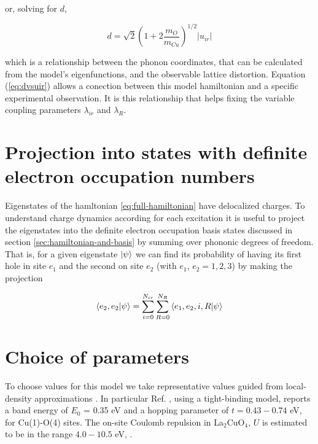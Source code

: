 \noindent or, solving for $d$,

\begin{equation}
  \label{eq:dvsuir}
  d=\sqrt{2}\left(1 + 2\frac{m_O}{m_{Cu}} \right)^{1/2}\left|u_{ir}\right|
\end{equation}

\noindent which is a relationship between the phonon coordinates, that can be calculated from the model's eigenfunctions, and the observable lattice distortion. 
Equation (\ref{eq:dvsuir}) allows a conection between this model hamiltonian and a specific experimental observation. 
It is this relationship that helps fixing the variable coupling parameters $\lambda_{ir}$ and $\lambda_R$.

\section{Projection into states with definite electron occupation numbers}
\label{sec:electronic-projection}

Eigenstates of the hamltonian \ref{eq:full-hamiltonian} have delocalized charges.
To understand charge dynamics according for each excitation it is useful to project the eigenstates into the definite electron occupation basis states discussed in section \ref{sec:hamiltonian-and-basis} by summing over phononic degrees of freedom.
That is, for a given eigenstate $\left | \psi \right\rangle$ we can find its probability of having its first hole in site $e_1$ and the second on site $e_2$ (with $e_1$, $e_2=1,2,3$) by making the projection

\begin{equation}
  \label{eq:electron-occupation}
  \left\langle e_2,e_2|\psi\right\rangle = \sum_{i=0}^{N_{ir}}\sum_{R=0}^{N_R} \left\langle e_1,e_2,i,R|\psi\right\rangle
\end{equation}

\section{Choice of parameters}
\label{sec:model-parameters}

To choose values for this model we take representative values guided from local-density approximations \cite{Pickett1989}. 
In particular Ref. \cite{DeWeert1989}, using a tight-binding model, reports a band energy of $E_0$ = 0.35 eV and a hopping parameter of $t=0.43-0.74$ eV, for Cu(1)-O(4) sites.
The on-site Coulomb repulsion in La$_2$CuO$_4$, $U$  is estimated to be in the range $4.0-10.5$ eV, \cite{Hybertsen1989}. 


